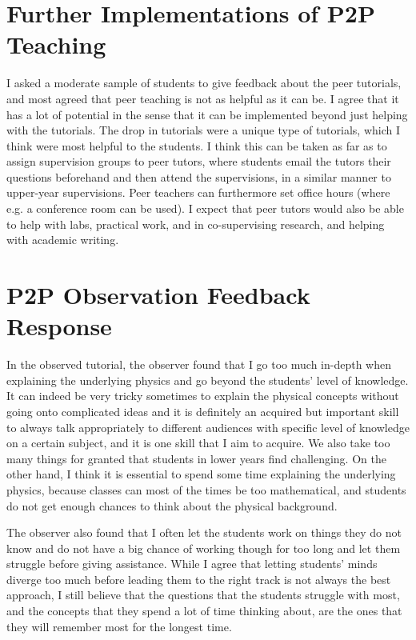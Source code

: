 \documentclass[12pt,avenir,a4paper,final]{iopart}
\begin{document}
\section{Further Implementations of P2P Teaching}
\indent \par{} I asked a moderate sample of students to give feedback about the peer tutorials, and most agreed that peer teaching is not as helpful as it can be. I agree that it has a lot of potential in the sense that it can be implemented beyond just helping with the tutorials. The drop in tutorials were a unique type of tutorials, which I think were most helpful to the students. I think this can be taken as far as to assign supervision groups to peer tutors, where students email the tutors their questions beforehand and then attend the supervisions, in a similar manner to upper-year supervisions. Peer teachers can furthermore set office hours (where e.g. a conference room can be used). I expect that peer tutors would also be able to help with labs, practical work, and in co-supervising research, and helping with academic writing.

\section{P2P Observation Feedback Response}
\indent \par{}
In the observed tutorial, the observer found that I go too much in-depth when explaining the underlying physics and go beyond the students' level of knowledge. It can indeed be very tricky sometimes to explain the physical concepts without going onto complicated ideas and it is definitely an acquired but important skill to always talk appropriately to different audiences with specific level of knowledge on a certain subject, and it is one skill that I aim to acquire. We also take too many things for granted that students in lower years find challenging. On the other hand, I think it is essential to spend some time explaining the underlying physics, because classes can most of the times be too mathematical, and students do not get enough chances to think about the physical background. 

\indent \par{} The observer also found that I often let the students work on things they do not know and do not have a big chance of working though for too long and let them struggle before giving assistance. While I agree that letting students' minds diverge too much before leading them to the right track is not always the best approach, I still believe that the questions that the students struggle with most, and the concepts that they spend a lot of time thinking about, are the ones that they will remember most for the longest time. 
\end{document}
